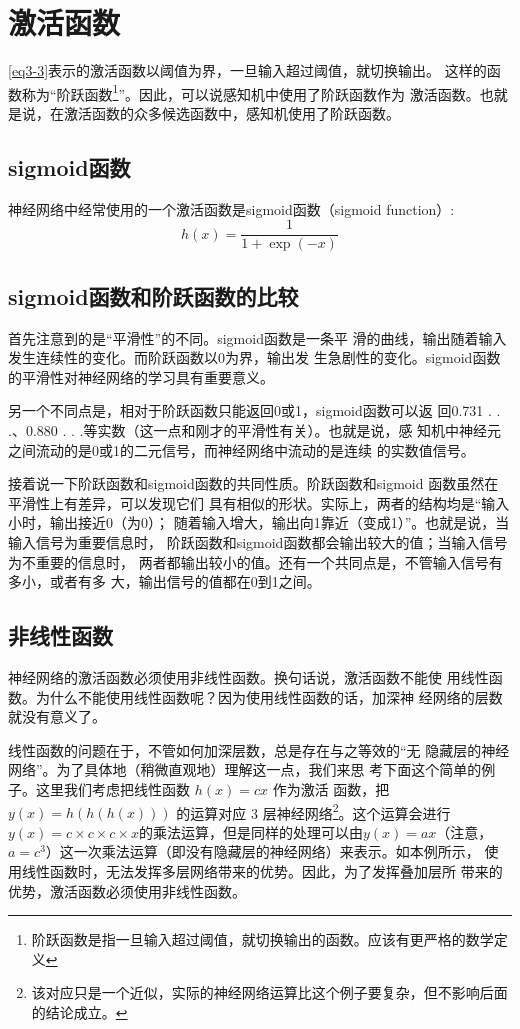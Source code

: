 \section{激活函数}
\autoref{eq3-3}表示的激活函数以阈值为界，一旦输入超过阈值，就切换输出。
这样的函数称为“阶跃函数\footnote{阶跃函数是指一旦输入超过阈值，就切换输出的函数。应该有更严格的数学定义}”。因此，可以说感知机中使用了阶跃函数作为
激活函数。也就是说，在激活函数的众多候选函数中，感知机使用了阶跃函数。
\subsection{sigmoid函数}
神经网络中经常使用的一个激活函数是sigmoid函数（sigmoid function）:
\begin{equation}
    h(x)=\frac{1}{1+\exp(-x)}
\end{equation}
\subsection{sigmoid函数和阶跃函数的比较}
首先注意到的是“平滑性”的不同。sigmoid函数是一条平
滑的曲线，输出随着输入发生连续性的变化。而阶跃函数以0为界，输出发
生急剧性的变化。sigmoid函数的平滑性对神经网络的学习具有重要意义。

另一个不同点是，相对于阶跃函数只能返回0或1，sigmoid函数可以返
回0.731 . . .、0.880 . . .等实数（这一点和刚才的平滑性有关）。也就是说，感
知机中神经元之间流动的是0或1的二元信号，而神经网络中流动的是连续
的实数值信号。

接着说一下阶跃函数和sigmoid函数的共同性质。阶跃函数和sigmoid
函数虽然在平滑性上有差异，可以发现它们
具有相似的形状。实际上，两者的结构均是“输入小时，输出接近0（为0）；
随着输入增大，输出向1靠近（变成1）”。也就是说，当输入信号为重要信息时，
阶跃函数和sigmoid函数都会输出较大的值；当输入信号为不重要的信息时，
两者都输出较小的值。还有一个共同点是，不管输入信号有多小，或者有多
大，输出信号的值都在0到1之间。

\subsection{非线性函数}
神经网络的激活函数必须使用非线性函数。换句话说，激活函数不能使
用线性函数。为什么不能使用线性函数呢？因为使用线性函数的话，加深神
经网络的层数就没有意义了。

线性函数的问题在于，不管如何加深层数，总是存在与之等效的“无
隐藏层的神经网络”。为了具体地（稍微直观地）理解这一点，我们来思
考下面这个简单的例子。这里我们考虑把线性函数 $h(x) = cx$ 作为激活
函数，把 $y(x) = h(h(h(x)))$ 的运算对应 3 层神经网络\footnote{该对应只是一个近似，实际的神经网络运算比这个例子要复杂，但不影响后面的结论成立。}。这个运算会进行
$y(x) = c \times c \times c \times x$的乘法运算，但是同样的处理可以由$y(x) = ax$（注意，
$a = c^3$）这一次乘法运算（即没有隐藏层的神经网络）来表示。如本例所示，
使用线性函数时，无法发挥多层网络带来的优势。因此，为了发挥叠加层所
带来的优势，激活函数必须使用非线性函数。

